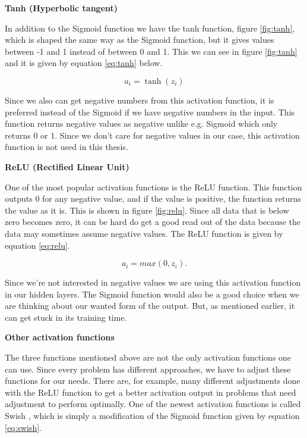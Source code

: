 \textbf{Tanh (Hyperbolic tangent)}

In addition to the Sigmoid function we have the tanh function, figure \ref{fig:tanh}, which is shaped the same way as the Sigmoid function, but it gives values between -1 and 1 instead of between 0 and 1. This we can see in figure \ref{fig:tanh} and it is given by equation \ref{eq:tanh} below.

\begin{equation}
\label{eq:tanh}
a_i = \tanh(z_i)
\end{equation}

Since we also can get negative numbers from this activation function, it is preferred instead of the Sigmoid if we have negative numbers in the input. This function returns negative values as negative unlike e.g. Sigmoid which only returns 0 or 1. Since we don't care for negative values in our case, this activation function is not used in this thesis. 

\textbf{ReLU (Rectified Linear Unit)}

One of the most popular activation functions is the ReLU function. This function outputs 0 for any negative value, and if the value is positive, the function returns the value as it is. This is shown in figure \ref{fig:relu}. Since all data that is below zero becomes zero, it can be hard do get a good read out of the data because the data may sometimes assume negative values. The ReLU function is given by equation \ref{eq:relu}.

\begin{equation}
\label{eq:relu}
    a_i = max(0,z_i).
\end{equation}

Since we're not interested in negative values we are using this activation function in our hidden layers. The Sigmoid function would also be a good choice when we are thinking about our wanted form of the output. But, as mentioned earlier, it can get stuck in its training time.

\textbf{Other activation functions}

The three functions mentioned above are not the only activation functions one can use. Since every problem has different approaches, we have to adjust these functions for our needs. There are, for example, many different adjustments done with the ReLU function to get a better activation output in problems that need adjustment to perform optimally. One of the newest activation functions is called Swish \cite{Swish}, which is simply a modification of the Sigmoid function given by equation \ref{eq:swish}. 

